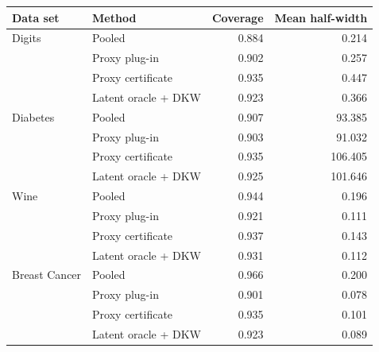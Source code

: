 \begin{tabular}{llrr}
\hline
Data set & Method & Coverage & Mean half-width \\
\hline
Digits & Pooled & 0.884 & 0.214 \\
 & Proxy plug-in & 0.902 & 0.257 \\
 & Proxy certificate & 0.935 & 0.447 \\
 & Latent oracle + DKW & 0.923 & 0.366 \\
\hline
Diabetes & Pooled & 0.907 & 93.385 \\
 & Proxy plug-in & 0.903 & 91.032 \\
 & Proxy certificate & 0.935 & 106.405 \\
 & Latent oracle + DKW & 0.925 & 101.646 \\
\hline
Wine & Pooled & 0.944 & 0.196 \\
 & Proxy plug-in & 0.921 & 0.111 \\
 & Proxy certificate & 0.937 & 0.143 \\
 & Latent oracle + DKW & 0.931 & 0.112 \\
\hline
Breast Cancer & Pooled & 0.966 & 0.200 \\
 & Proxy plug-in & 0.901 & 0.078 \\
 & Proxy certificate & 0.935 & 0.101 \\
 & Latent oracle + DKW & 0.923 & 0.089 \\
\hline
\end{tabular}
